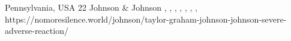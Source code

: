           {
            Pennsylvania, USA
          }
          {
            22
          }
          {
            Johnson \& Johnson
          }
          {
          }
          {
            ,
            ,
            ,
            ,
            ,
            ,
            ,
          }
          {
            https://nomoresilence.world/johnson/taylor-graham-johnson-johnson-severe-adverse-reaction/
          }

